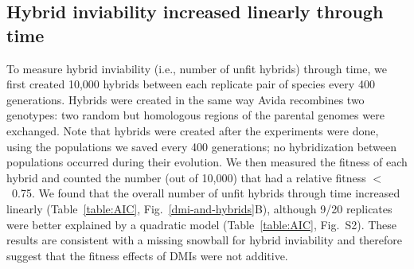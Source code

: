 \begin{doublespace}
\subsection{Hybrid inviability increased linearly through time}

To measure hybrid inviability (i.e., number of unfit hybrids) through time,
we first created 10,000 hybrids between each replicate pair of species
every 400 generations.
%
Hybrids were created in the same way Avida recombines two genotypes:
two random but homologous regions of the parental genomes were exchanged.
%
Note that hybrids were created after the experiments were done,
using the populations we saved every 400 generations;
no hybridization between populations occurred during their evolution.
%
We then measured the fitness of each hybrid and counted the number
(out of 10,000) that had a relative fitness $<$~0.75.
%
We found that the overall number of unfit hybrids through time
increased linearly (Table~\ref{table:AIC}, Fig.~\ref{dmi-and-hybrids}B),
although 9/20 replicates were better explained by a quadratic model
(Table~\ref{table:AIC}, Fig.~S2).
%
These results are consistent with a missing snowball for hybrid inviability
and therefore suggest that the fitness effects of DMIs were not additive.




\end{doublespace}

